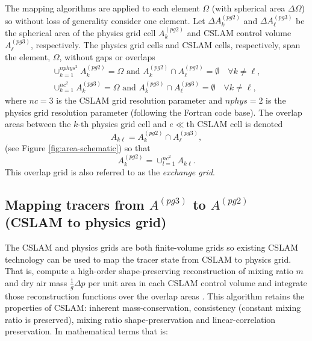 The mapping algorithms are applied to each element $\Omega$ (with spherical area $\Delta \Omega$) so without loss of generality consider one element. Let $\Delta A^{(pg2)}_k$ and $\Delta A^{(pg3)}_\ell$ be the spherical area of the physics grid cell $A^{(pg2)}_k$ and CSLAM control volume $A^{(pg3)}_\ell$, respectively. The physics grid cells and CSLAM cells, respectively, span the element, $\Omega$, without gaps or overlaps
\begin{eqnarray}
\cup_{k=1}^{nphys^2}A^{(pg2)}_k=\Omega \text{ and } A^{(pg2)}_k \cap A^{(pg2)}_\ell = \emptyset \quad \forall k\ne \ell,\\
\cup_{k=1}^{nc^2}A^{(pg3)}_k=\Omega \text{ and } A^{(pg3)}_k \cap A^{(pg3)}_\ell = \emptyset \quad \forall k\ne \ell,
\end{eqnarray}
where $nc=3$ is the CSLAM grid resolution parameter and $nphys=2$ is the physics grid  resolution parameter (following the Fortran code base).
The overlap areas between the $k$-th physics grid cell and $e\ll$th CSLAM cell is denoted
\begin{equation}
A_{k\ell}=A^{(pg2)}_k \cap A^{(pg3)}_\ell,
\end{equation}
(see Figure \ref{fig:area-schematic}) so that
\begin{equation}
A^{(pg2)}_k=\cup_{l=1}^{nc^2}A_{k\ell}.
\end{equation}
This overlap grid is also referred to as the {\em{exchange grid}}.
\subsection{Mapping tracers from $A^{(pg3)}$ to $A^{(pg2)}$ (CSLAM to physics grid)}\label{sec:nctopg}
The CSLAM and physics grids are both finite-volume grids so existing CSLAM technology can be used to map the tracer state from CSLAM to physics grid. That is, compute a high-order shape-preserving reconstruction of mixing ratio $m$ and dry air mass  $\frac{1}{g}\Delta p$ per unit area in each CSLAM control volume and integrate those reconstruction functions over the overlap areas \citep{LNU2010JCP,NL2010JCP}. This algorithm retains the properties of CSLAM: inherent mass-conservation, consistency (constant mixing ratio is preserved), mixing ratio shape-preservation and linear-correlation preservation. In mathematical terms that is:

